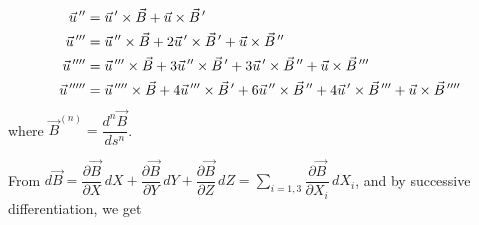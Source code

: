 \begin{equation}
	\begin{aligned}
		\vec  u^{\,\prime\prime}
		         &   =   \vec  u^{\,\prime}   \times   \vec  B + \vec  u  \times  
		         \vec B^{\,\prime} \\
		\vec u^{\,\prime\prime\prime}
		         & = \vec  u^{\,\prime\prime}   \times   \vec  B 
		         + 2\vec  u^{\,\prime}  \times   \vec  B^{\,\prime}  
		         + \vec  u \times  \vec  B^{\,\prime\prime} \\
		\vec u^{\,\prime\prime\prime\prime} 
		         &   =  \vec u^{\,\prime\prime\prime}  \times   \vec  B 
		         + 3\vec  u^{\,\prime\prime}   \times  \vec  B^{\,\prime}  
		         + 3\vec  u^{\,\prime}   \times   \vec  B^{\,\prime\prime}   
		         +\vec	u  \times  \vec  B^{\,\prime\prime\prime} \\
		\vec  u^{\,\prime\prime\prime\prime\prime}
		         &  =  \vec u^{\,\prime\prime\prime\prime}  \times \vec  B 
		         + 4\vec u^{\,\prime\prime\prime}  \times  \vec  B^{\,\prime}  
		         + 6\vec  u^{\,\prime\prime} \times   \vec  B^{\,\prime\prime}  
		         + 4\vec  u^{\,\prime}   \times   \vec B^{\,\prime\prime\prime} 
		         + \vec  u  \times   \vec  B^{\,\prime\prime\prime\prime}
	\end{aligned}
	\label{eq2-2-6}
\end{equation}
%
 where $ \vec  B^{(n)} = \dfrac{d^n\vec  B}{ds^n}$. 

\noindent From $ d\vec  B = \dfrac{\partial\vec  B}{\partial X}\, dX
     +\dfrac{\partial\vec  B}{\partial Y}\, dY+
     \dfrac{\partial\vec  B}{\partial Z}\, dZ
     = \sum_{i=1,3}\dfrac{\partial\vec  B}{\partial X_i}\, dX_i$,  
and by successive differentiation, we get 

